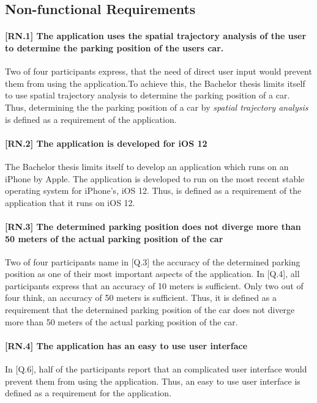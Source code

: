 \subsection{Non-functional Requirements}

\paragraph{[RN.1] The application uses the spatial trajectory analysis of the user to determine the parking position of the users car.}
Two of four participants express, that the need of direct user input would prevent them from using the application.To achieve this, the Bachelor thesis limits itself to use spatial trajectory analysis to determine the parking position of a car. Thus, determining the the parking position of a car by \textit{spatial trajectory analysis} is defined as a requirement of the application.

\paragraph{[RN.2] The application is developed for iOS 12}
The Bachelor thesis limits itself to develop an application which runs on an iPhone by Apple. The application is developed to run on the most recent stable operating system for iPhone's, iOS 12. Thus, is defined as a requirement of the application that it runs on iOS 12.

\paragraph{[RN.3] The determined parking position does not diverge more than 50 meters of the actual parking position of the car}
Two of four participants name in [Q.3] the accuracy of the determined parking position as one of their most important aspects of the application. In [Q.4], all participants express that an accuracy of 10 meters is sufficient. Only two out of four think, an accuracy of 50 meters is sufficient. Thus, it is defined as a requirement that the determined parking position of the car does not diverge more than 50 meters of the actual parking position of the car.


\paragraph{[RN.4] The application has an easy to use user interface}
In [Q.6], half of the participants report that an complicated user interface would prevent them from using the application. Thus, an easy to use user interface is defined as a requirement for the application.

